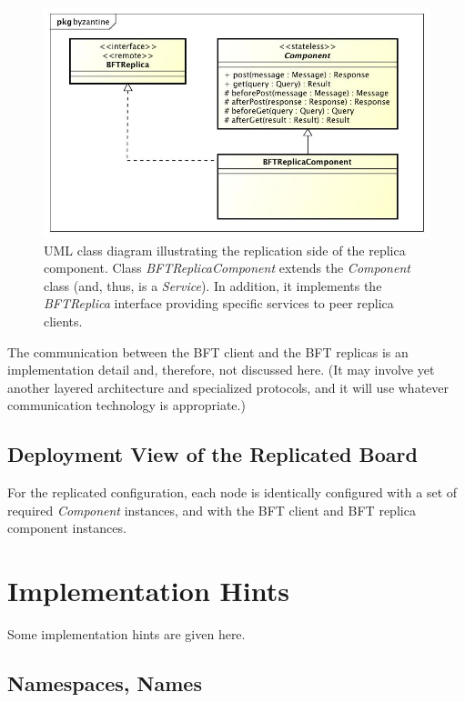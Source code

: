 \documentclass[oneside]{scrreprt}
\begin{document}
\begin{figure}[ht<]
\centerline{
\includegraphics[width=1.0\textwidth]{figs/byzantine-replica}}
\caption{UML class diagram illustrating the replication side
of the replica component. Class \emph{BFTReplicaComponent}
extends the \emph{Component} class (and, thus, is a \emph{Service}). In
addition, it implements the \emph{BFTReplica} interface providing
specific services to peer replica clients.}
\label{fig:byzantine-replica}
\end{figure}

The communication between the BFT client and the BFT replicas
is an implementation detail and, therefore, not discussed here.
(It may involve yet another layered architecture and specialized
protocols, and it will use whatever communication technology
is appropriate.)


\section{Deployment View of the Replicated Board}

For the replicated configuration, each node is identically
configured with a set of required \emph{Component} instances, and
with the BFT client and BFT replica component instances.


\chapter{Implementation Hints}

Some implementation hints are given here.

\section{Namespaces, Names}
\end{document}
